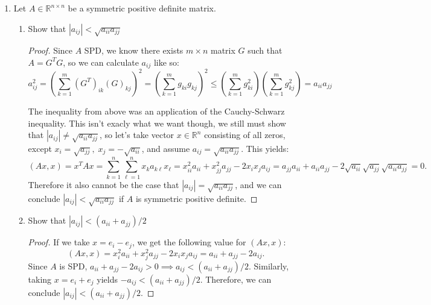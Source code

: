 \documentclass[11pt]{article}
\newcommand{\R}{\mathbb{R}}
\begin{document}
\begin{enumerate}
	\item Let \(A \in \R^{n \times n}\) be a symmetric positive definite matrix.
	      \begin{enumerate}
		      \item Show that \(|a_{ij}| < \sqrt{a_{ii}a_{jj}}\)
		            \begin{proof}
			            Since \(A\) SPD, we know there exists \(m \times n\) matrix \(G\) such that \(A = G^T G\), so we can calculate \(a_{ij}\) like so:
			            \[a_{ij}^2 = \left( \sum_{k=1}^m (G^T)_{ik}(G)_{kj} \right)^2 = \left( \sum_{k=1}^m g_{ki}g_{kj} \right)^2 \leq \left( \sum_{k=1}^m g_{ki}^2 \right) \left( \sum_{k=1}^m g_{kj}^2 \right) = a_{ii}a_{jj} \]

			            The inequality from above was an application of the Cauchy-Schwarz inequality.  This isn't exacly what we want though, we still must show that \(|a_{ij}| \neq \sqrt{a_{ii}a_{jj}}\), so let's take vector \(x \in \R^n\) consisting of all zeros, except \(x_i = \sqrt{a_{jj}}, \; x_j = -\sqrt{a_{ii}}\), and assume \(a_{ij} = \sqrt{a_{ii}a_{jj}}\).  This yields:
			            \[(Ax,x) = x^T A x = \textstyle\sum\limits_{k=1}^n \textstyle\sum\limits_{\ell=1}^n x_k a_{k \ell} x_\ell = x_{ii}^2a_{ii} + x_{jj}^2a_{jj} - 2x_ix_ja_{ij} = a_{jj}a_{ii} + a_{ii}a_{jj} - 2\sqrt{a_{ii}}\sqrt{a_{jj}}\sqrt{a_{ii}a_{jj}} = 0.\]
			            Therefore it also cannot be the case that \(|a_{ij}| = \sqrt{a_{ii}a_{jj}}\), and we can conclude \(|a_{ij}| < \sqrt{a_{ii}a_{jj}}\) if \(A\) is symmetric positive definite.
		            \end{proof}

		      \item Show that \(|a_{ij}| < (a_{ii}+a_{jj})/2\)
		            \begin{proof}
			            If we take \(x = e_i - e_j\), we get the following value for \((Ax,x)\):
			            \[(Ax,x) = x_i^2a_{ii} + x_j^2a_{jj} - 2x_ix_ja_{ij} = a_{ii} + a_{jj} - 2a_{ij}.\]
			            Since \(A\) is SPD, \(a_{ii} + a_{jj} - 2a_{ij} > 0 \implies a_{ij} < (a_{ii}+a_{jj})/2\).  Similarly, taking \(x = e_i + e_j\) yields \(-a_{ij} < (a_{ii}+a_{jj})/2\).  Therefore, we can conclude \(|a_{ij}| < (a_{ii}+a_{jj})/2\).
		            \end{proof}
	      \end{enumerate}


\end{enumerate}
\end{document}
